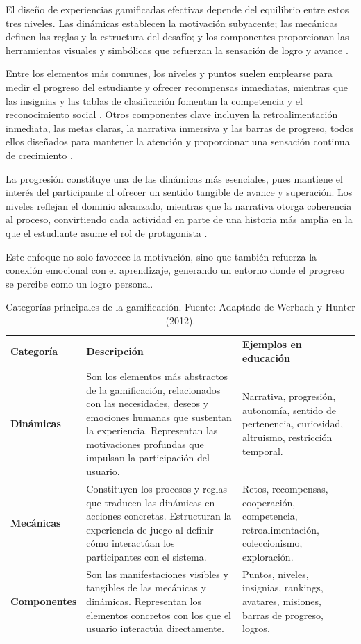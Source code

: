 El diseño de experiencias gamificadas efectivas depende del equilibrio entre estos tres niveles. Las dinámicas establecen la motivación subyacente; las mecánicas definen las reglas y la estructura del desafío; y los componentes proporcionan las herramientas visuales y simbólicas que refuerzan la sensación de logro y avance \cite{puritat_enhanced_2019}.

Entre los elementos más comunes, los niveles y puntos suelen emplearse para medir el progreso del estudiante y ofrecer recompensas inmediatas, mientras que las insignias y las tablas de clasificación fomentan la competencia y el reconocimiento social \cite{puritat_enhanced_2019}.  
Otros componentes clave incluyen la retroalimentación inmediata, las metas claras, la narrativa inmersiva y las barras de progreso, todos ellos diseñados para mantener la atención y proporcionar una sensación continua de crecimiento \cite{puritat_enhanced_2019}.

La progresión constituye una de las dinámicas más esenciales, pues mantiene el interés del participante al ofrecer un sentido tangible de avance y superación. Los niveles reflejan el dominio alcanzado, mientras que la narrativa otorga coherencia al proceso, convirtiendo cada actividad en parte de una historia más amplia en la que el estudiante asume el rol de protagonista \cite{ortiz-colon_gamificacion_2018, puritat_enhanced_2019}.  

Este enfoque no solo favorece la motivación, sino que también refuerza la conexión emocional con el aprendizaje, generando un entorno donde el progreso se percibe como un logro personal.

\begin{table}[H]
	\centering
	\label{tab:gamification-components}
	\caption{Categorías principales de la gamificación. Fuente: Adaptado de Werbach y Hunter (2012).}
	\begin{tabular}{|p{3cm}|p{7cm}|p{4cm}|}
		\hline
		\textbf{Categoría} & \textbf{Descripción} & \textbf{Ejemplos en educación} \\ \hline
		\textbf{Dinámicas} & Son los elementos más abstractos de la gamificación, relacionados con las necesidades, deseos y emociones humanas que sustentan la experiencia. Representan las motivaciones profundas que impulsan la participación del usuario. & Narrativa, progresión, autonomía, sentido de pertenencia, curiosidad, altruismo, restricción temporal. \\ \hline
		\textbf{Mecánicas} & Constituyen los procesos y reglas que traducen las dinámicas en acciones concretas. Estructuran la experiencia de juego al definir cómo interactúan los participantes con el sistema. & Retos, recompensas, cooperación, competencia, retroalimentación, coleccionismo, exploración. \\ \hline
		\textbf{Componentes} & Son las manifestaciones visibles y tangibles de las mecánicas y dinámicas. Representan los elementos concretos con los que el usuario interactúa directamente. & Puntos, niveles, insignias, rankings, avatares, misiones, barras de progreso, logros. \\ \hline
	\end{tabular}
\end{table}

